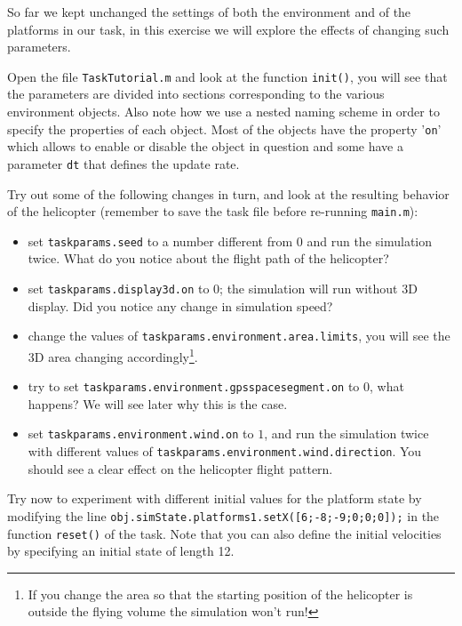 \documentclass[a4paper,11pt]{article}
\begin{document}
So far we kept unchanged the settings of both the environment and of the platforms in our task, in this exercise we will explore the effects of changing such parameters.

Open the file \texttt{TaskTutorial.m} and look at the function \texttt{init()}, you will see that the parameters are divided into sections corresponding to the various environment objects. Also note how we use a nested naming scheme in order to specify the properties of each object.
Most of the objects have the property '\texttt{on}' which allows to enable or disable the object in question and some have a parameter \texttt{dt} that defines the update rate.

Try out some of the following changes \textsf{in turn}, and look at the resulting behavior of the helicopter (remember to save the task file before re-running \texttt{main.m}): 
\begin{itemize}
 \item set \texttt{taskparams.seed} to a number different from $0$ and run the simulation twice. What do you notice about the flight path of the helicopter?
 \item set \texttt{taskparams.display3d.on} to $0$; the simulation will run without 3D display. Did you notice any change in simulation speed?
 \item change the values of \texttt{taskparams.environment.area.limits}, you will see the 3D area changing accordingly\footnote{If you change the area so that the starting position of the helicopter is outside the flying volume the simulation won't run!}.
 \item try to set \texttt{taskparams.environment.gpsspacesegment.on} to $0$, what happens? We will see later why this is the case.
 \item set \texttt{taskparams.environment.wind.on} to $1$, and run the simulation twice with different values of \texttt{taskparams.environment.wind.direction}. You should see a clear effect on the helicopter flight pattern.
\end{itemize}

Try now to experiment with different initial values for the platform state by modifying the line \texttt{obj.simState.platforms{1}.setX([6;-8;-9;0;0;0]);} in the function \texttt{reset()} of the task. Note that you can also define the initial velocities by specifying an initial state of length 12.
\end{document}

